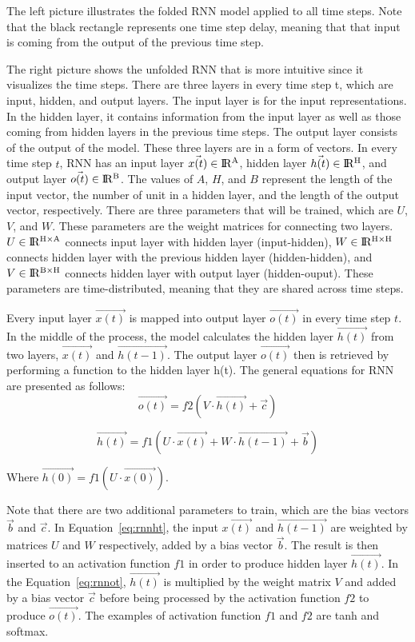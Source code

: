 The left picture illustrates the folded RNN model applied to all time steps. Note that the black rectangle represents one time step delay, meaning that that input is coming from the output of the previous time step. 

The right picture shows the unfolded RNN that is more intuitive since it visualizes the time steps. There are three layers in every time step t, which are input, hidden, and output layers. The input layer is for the input representations. In the hidden layer, it contains information from the input layer as well as those coming from hidden layers in the previous time steps. The output layer consists of the output of the model. These three layers are in a form of vectors. In every time step $t$, RNN has an input layer $ \vec{x(t)} \in {\rm I\!R^{A}} $, hidden layer $ \vec{h(t)} \in {\rm I\!R^{H}} $, and output layer $ \vec{o(t)} \in {\rm I\!R^{B}} $. The values of $A$, $H$, and $B$ represent the length of the input vector, the number of unit in a hidden layer, and the length of the output vector, respectively. There are three parameters that will be trained, which are $U$, $V$, and $W.$ These parameters are the weight matrices for connecting two layers. $ U \in {\rm I\!R^{H \times A }}$ connects input layer with hidden layer (input-hidden), $ W \in {\rm I\!R^{H \times H}}$ connects hidden layer with the previous hidden layer (hidden-hidden), and $ V \in {\rm I\!R^{B \times H}}$ connects hidden layer with output layer (hidden-ouput). These parameters are time-distributed, meaning that they are shared across time steps. 

Every input layer $ \vec{x(t)} $ is mapped into output layer $ \vec{o(t)} $ in every time step $t$. In the middle of the process, the model calculates the hidden layer $ \vec{h(t)} $ from two layers, $ \vec{x(t)} $ and $ \vec{h(t-1)} $. The output layer $ \vec{o(t)} $ then is retrieved by performing a function to the hidden layer h(t). The general equations for RNN are presented as follows:
\begin{equation}
\label{eq:rnnot}
\vec{o(t)} = f2(V \cdot \vec{h(t)} + \vec{c})
\end{equation}

\begin{equation}
\label{eq:rnnht}
\vec{h(t)} = f1(U \cdot \vec{x(t)} + W \cdot \vec{h(t-1)} + \vec{b})
\end{equation}

Where $ \vec{h(0)} = f1(U \cdot \vec{x(0)}) $.

Note that there are two additional parameters to train, which are the bias vectors $\vec{b}$ and $\vec{c}$. In Equation~\ref{eq:rnnht}, the input $\vec{x(t)}$ and $\vec{h(t-1)}$ are weighted by matrices $U$ and $W$ respectively, added by a bias vector $\vec{b}$. The result is then inserted to an activation function $f1$ in order to produce hidden layer $\vec{h(t)}$. In the Equation~\ref{eq:rnnot}, $\vec{h(t)}$ is multiplied by the weight matrix $V$ and added by a bias vector $\vec{c}$ before being processed by the activation function $f2$ to produce $\vec{o(t)}$. The examples of activation function $f1$ and $f2$ are tanh and softmax.

